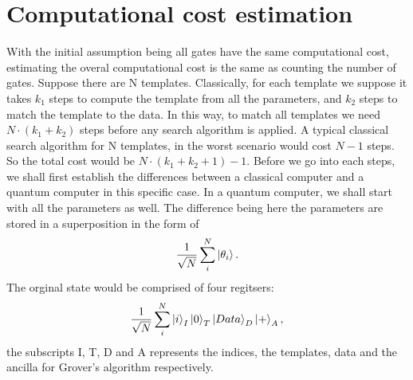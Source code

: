 \documentclass[a4paper]{jpconf}
\begin{document}
\section{Computational cost estimation}
With the initial assumption being all gates have the same computational cost, estimating the overal computational cost is the same as counting the number of gates. 
\newline\newline Suppose there are N templates. Classically, for each template we suppose it takes $k_1$ steps to compute the template from all the parameters, and $k_2$ steps to match the template to the data. In this way, to match all templates we need $N \cdot (k_1+k_2)$ steps before any search algorithm is applied. A typical classical search algorithm for N templates, in the worst scenario would cost $N-1$ steps. So the total cost would be $N \cdot (k_1+k_2+1)-1$.
\newline \newline Before we go into each steps, we shall first establish the differences between a classical computer and a quantum computer in this specific case.
\newline \newline In a quantum computer, we shall start with all the parameters as well. The difference being here the parameters are stored in a superposition in the form of 
\begin{equation}
\label{0}
    \frac{1}{\sqrt{N}}\sum^N_i\ket{\theta_i}.
\end{equation}
The orginal state would be comprised of four regitsers:
\begin{equation}
\label{step0}
    \frac{1}{\sqrt{N}}\sum^N_i\ket{i}_I\ket{0}_T\ket{Data}_D\ket{+}_A,
\end{equation}
the subscripts I, T, D and A represents the indices, the templates, data and the ancilla for Grover's algorithm respectively. 
\end{document}

